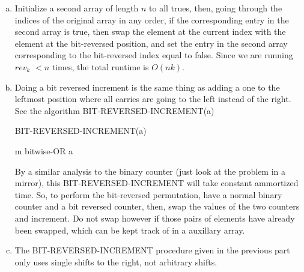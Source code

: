 \documentclass{article}
\begin{document}
\begin{enumerate}[a.]
\item
Initialize a second array of length $n$ to all trues, then, going through the indices of the original array in any order, if  the corresponding entry in the second array is true, then swap the element at the current index with the element at the bit-reversed position, and set the entry in the second array corresponding to the bit-reversed index equal to false. Since we are running $rev_k$ $< n$ times, the total runtime is $O(nk)$.
\item
Doing a bit reversed increment is the same thing as adding a one to the leftmost position where all carries are going to the left instead of the right. See the algorithm BIT-REVERSED-INCREMENT(a)

\begin{algorithm}
\caption{BIT-REVERSED-INCREMENT(a)}
\begin{algorithmic}
\EndWhile
\Return m bitwise-OR a
\end{algorithmic}
\end{algorithm}

By a similar analysis to the binary counter (just look at the problem in a mirror), this BIT-REVERSED-INCREMENT will take constant ammortized time. So, to perform the bit-reversed permutation, have a normal binary counter and a bit reversed counter, then, swap the values of the two counters and increment. Do not swap however if those pairs of elements have already been swapped, which can be kept track of in a auxillary array.

\item The BIT-REVERSED-INCREMENT procedure given in the previous part only uses single shifts to the right, not arbitrary shifts.

\end{enumerate}
\end{document}
